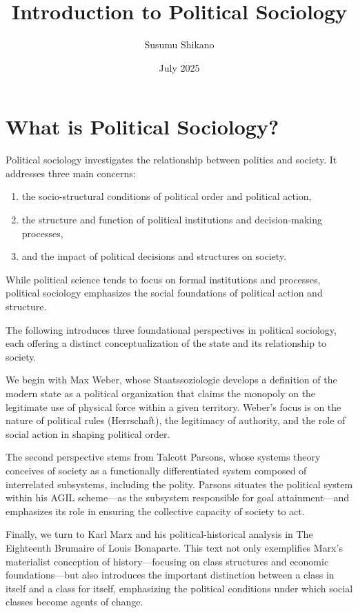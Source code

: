 \documentclass[12pt]{article}
\title{Introduction to Political Sociology}
\author{Susumu Shikano}
\date{July 2025}
\begin{document}
\maketitle

\section*{What is Political Sociology?}

Political sociology investigates the relationship between politics and society. It addresses three main concerns:
\begin{enumerate}
    \item the  socio-structural conditions of political order and political action,
    \item the structure and function of political institutions and decision-making processes,
    \item and the impact of political decisions and structures on society.
\end{enumerate}
While political science tends to focus on formal institutions and processes, political sociology emphasizes the social foundations of political action and structure.

The following introduces three foundational perspectives in political sociology, each offering a distinct conceptualization of the state and its relationship to society. 

We begin with Max Weber, whose Staatssoziologie develops a definition of the modern state as a political organization that claims the monopoly on the legitimate use of physical force within a given territory. Weber's focus is on the nature of political rules (Herrschaft), the legitimacy of authority, and the role of social action in shaping political order.

The second perspective stems from Talcott Parsons, whose systems theory conceives of society as a functionally differentiated system composed of interrelated subsystems, including the polity. Parsons situates the political system within his AGIL scheme—as the subsystem responsible for goal attainment—and emphasizes its role in ensuring the collective capacity of society to act. 

Finally, we turn to Karl Marx and his political-historical analysis in The Eighteenth Brumaire of Louis Bonaparte. This text not only exemplifies Marx’s materialist conception of history—focusing on class structures and economic foundations—but also introduces the important distinction between a class in itself and a class for itself, emphasizing the political conditions under which social classes become agents of change.
\end{document}
